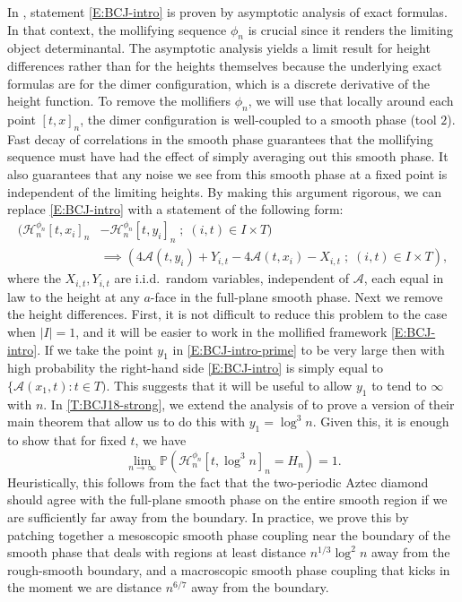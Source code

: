 \documentclass[11pt,twoside]{amsart}
\theoremstyle{plain}
\numberwithin{quest}{section}
\theoremstyle{remark}
\numberwithin{rem}{section}
\theoremstyle{definition}
\renewcommand{\P}{\mathbb{P}}
\newcommand{\cA}{\mathcal{A}}
\newcommand{\cH}{\mathcal{H}}
\begin{document}
	In \cite{BCJ18}, statement \eqref{E:BCJ-intro} is proven by asymptotic analysis of exact formulas. In that context, the mollifying sequence $\phi_n$ is crucial since it renders the limiting object determinantal. The asymptotic analysis yields a limit result for height differences rather than for the heights themselves because the underlying exact formulas are for the dimer configuration, which is a discrete derivative of the height function. To remove the mollifiers $\phi_n$, we will use that locally around each point $[t, x]_n$, the dimer configuration is well-coupled to a smooth phase (tool $2$). Fast decay of correlations in the smooth phase guarantees that the mollifying sequence must have had the effect of simply averaging out this smooth phase. It also guarantees that any noise we see from this smooth phase at a fixed point is independent of the limiting heights. By making this argument rigorous, we can replace \eqref{E:BCJ-intro} with a statement of the following form:
	\begin{equation}
		\label{E:BCJ-intro-prime}
		\begin{split}
			(\cH^{\phi_n}_n[t, x_i]_n &- \cH^{\phi_n}_n[t, y_i]_n \;;\; (i, t) \in I \times T) \\
			&\implies (4\cA(t, y_i) + Y_{i, t} - 4\cA(t, x_i) - X_{i, t} \;;\;  (i, t) \in I \times T),
		\end{split}
	\end{equation}
	where the $X_{i, t}, Y_{i, t}$ are i.i.d.\ random variables, independent of $\cA$,  each equal in law to the height at any $a$-face in the full-plane smooth phase. Next we remove the height differences. First, it is not difficult to reduce this problem to the case when $|I| = 1$, and it will be easier to work in the mollified framework \eqref{E:BCJ-intro}. If we take the point $y_1$ in \eqref{E:BCJ-intro-prime} to be very large then with high probability the right-hand side \eqref{E:BCJ-intro} is simply equal to $\{\cA(x_1, t) : t \in T)$. This suggests that it will be useful to allow $y_1$ to tend to $\infty$ with $n$. In \cref{T:BCJ18-strong}, we extend the analysis of \cite{BCJ18} to prove a version of their main theorem that allow us to do this with $y_1 = \log^{3} n$. Given this, it is enough to show that for fixed $t$, we have
	$$
	\lim_{n \to \infty} \P(\cH_n^{\phi_n}[t, \log^3 n]_n = H_n) = 1.
	$$
	Heuristically, this follows from the fact that the two-periodic Aztec diamond should agree with the full-plane smooth phase on the entire smooth region if we are sufficiently far away from the boundary. In practice, we prove this by patching together a mesoscopic smooth phase coupling near the boundary of the smooth phase that deals with regions at least distance $n^{1/3} \log^2 n$ away from the rough-smooth boundary, and a macroscopic smooth phase coupling that kicks in the moment we are distance $n^{6/7}$ away from the boundary.
	
\end{document}
